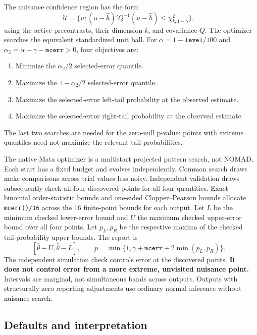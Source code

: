 \documentclass[11pt]{article}
\newcommand{\cmd}[1]{\texttt{#1}}
\begin{document}
The nuisance confidence region has the form
\[
 \mathcal U=\{u:(u-\widehat h)'Q^{-1}(u-\widehat h)
                   \leq\chi^2_{k,1-\gamma}\},
\]
using the active precontrasts, their dimension $k$, and covariance $Q$. The optimizer searches
the equivalent standardized unit ball. For
$\alpha=1-\texttt{level}/100$ and
$\alpha_2=\alpha-\gamma-\texttt{mcerr}>0$, four objectives are:
\begin{enumerate}
\item Minimize the $\alpha_2/2$ selected-error quantile.
\item Maximize the $1-\alpha_2/2$ selected-error quantile.
\item Maximize the selected-error left-tail probability at the observed estimate.
\item Maximize the selected-error right-tail probability at the observed estimate.
\end{enumerate}
The last two searches are needed for the zero-null p-value: points with
extreme quantiles need not maximize the relevant tail probabilities.

The native Mata optimizer is a multistart projected pattern search, not
NOMAD. Each start has a fixed budget and evolves independently. Common search
draws make comparisons across trial values less noisy. Independent validation
draws subsequently check all four discovered points for all four quantities.
Exact binomial order-statistic bounds and one-sided Clopper--Pearson bounds
allocate \cmd{mcerr()/16} across the 16 finite-point bounds for each output.
Let $L$ be the minimum checked lower-error bound and $U$ the maximum checked
upper-error bound over all four points. Let $p_L,p_R$ be the respective
maxima of the checked tail-probability upper bounds. The report is
\[
 [\widehat\theta-U,\widehat\theta-L],\qquad
 p=\min\{1,\gamma+\texttt{mcerr}+2\min(p_L,p_R)\}.
\]
The independent simulation check controls error at the discovered points.
\textbf{It does not control error from a more extreme, unvisited nuisance
point.} Intervals are marginal, not simultaneous bands across outputs.
Outputs with structurally zero reporting adjustments use ordinary normal
inference without nuisance search.

\subsection{Defaults and interpretation}
\end{document}
